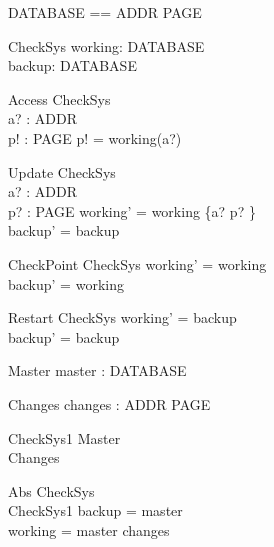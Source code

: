 \documentclass{llncs}
\begin{document}
\begin{zed}
\end{zed}

\begin{zed}
DATABASE == ADDR \fun PAGE
\end{zed}

\begin{schema}{CheckSys}
working: DATABASE \\
backup: DATABASE 
\end{schema}

\begin{schema}{Access}
\Xi CheckSys \\
a? : ADDR \\
p! : PAGE
\where
p! = working(a?)
\end{schema}

\begin{schema}{Update}
\Delta CheckSys \\
a? : ADDR \\
p? : PAGE
\where
working' = working \oplus \{a? \mapsto p? \} \\
backup' = backup
\end{schema}

\begin{schema}{CheckPoint}
\Delta CheckSys
\where
working' = working \\
backup' = working
\end{schema}

\begin{schema}{Restart}
\Delta CheckSys
\where
working' = backup \\
backup' = backup
\end{schema}

\begin{schema}{Master}
master : DATABASE
\end{schema}

\begin{schema}{Changes}
changes : ADDR \pfun PAGE
\end{schema}

\begin{schema}{CheckSys1}
Master \\
Changes
\end{schema}

\begin{schema}{Abs}
CheckSys \\
CheckSys1 
\where
backup = master \\
working = master \oplus changes
\end{schema}
\end{document}
